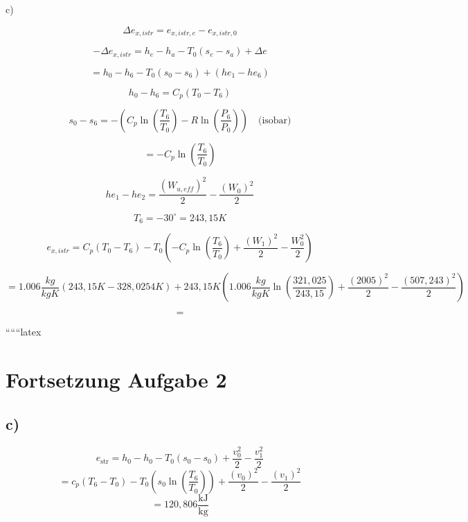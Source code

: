 c)

\[
\Delta e_{x,istr} = e_{x,istr,e} - e_{x,istr,0}
\]

\[
-\Delta e_{x,istr} = h_e - h_a - T_0 (s_e - s_a) + \Delta e
\]

\[
= h_0 - h_6 - T_0 (s_0 - s_6) + (he_1 - he_6)
\]

\[
h_0 - h_6 = C_p (T_0 - T_6)
\]

\[
s_0 - s_6 = - \left( C_p \ln \left( \frac{T_6}{T_0} \right) - R \ln \left( \frac{P_6}{P_0} \right) \right) \quad \text{(isobar)}
\]

\[
= - C_p \ln \left( \frac{T_6}{T_0} \right)
\]

\[
he_1 - he_2 = \frac{(W_{u,eff})^2}{2} - \frac{(W_0)^2}{2}
\]

\[
T_6 = -30^\circ = 243,15 K
\]

\[
e_{x,istr} = C_p (T_0 - T_6) - T_0 \left( -C_p \ln \left( \frac{T_6}{T_0} \right) + \frac{(W_1)^2}{2} - \frac{W_0^2}{2} \right)
\]

\[
= 1.006 \frac{kg}{kgK} (243,15 K - 328,0254 K) + 243,15 K \left( 1.006 \frac{kg}{kgK} \ln \left( \frac{321,025}{243,15} \right) + \frac{(2005)^2}{2} - \frac{(507,243)^2}{2} \right)
\]

\[
=
\]

``````latex


\section*{Fortsetzung Aufgabe 2}



\subsection*{c)}
\[
e_{\text{str}} = h_0 - h_0 - T_0 (s_0 - s_0) + \frac{v_0^2}{2} - \frac{v_1^2}{2}
\]
\[
= c_p (T_6 - T_0) - T_0 \left( s_0 \ln \left( \frac{T_6}{T_0} \right) \right) + \frac{(v_0)^2}{2} - \frac{(v_1)^2}{2}
\]
\[
= 120,806 \frac{\text{kJ}}{\text{kg}}
\]